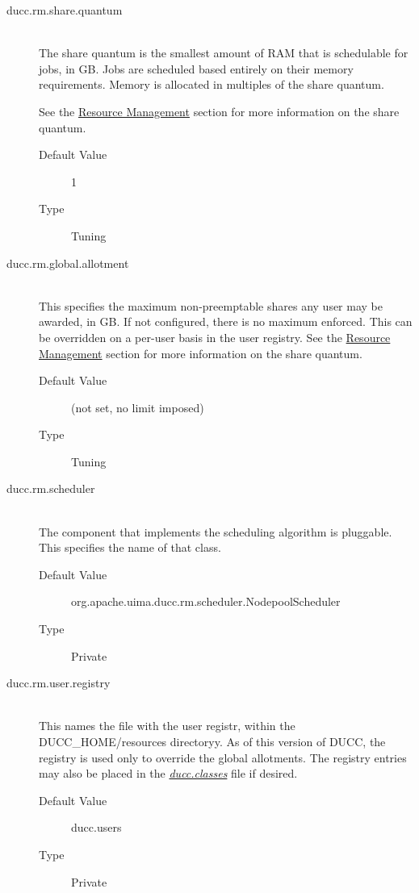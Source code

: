 \begin{description}
        \item[ducc.rm.share.quantum] \hfill \\
          The share quantum is the smallest amount of RAM that is schedulable for jobs, in GB. 
          Jobs are scheduled based entirely on their memory requirements. Memory is allocated in 
          multiples of the share quantum. 

          See the \hyperref[chap:rm]{Resource Management} section for more information on the share quantum.
          \begin{description}
            \item[Default Value] 1
            \item[Type] Tuning 
          \end{description}

        \item[ducc.rm.global.allotment] \hfill \\
          This specifies the maximum non-preemptable shares any user may be awarded, in GB.  If not configured,
          there is no maximum enforced.  This can be overridden on a per-user basis in the user registry.
          See the \hyperref[chap:rm]{Resource Management} section for more information on the share quantum.
          \begin{description}
            \item[Default Value] (not set, no limit imposed)
            \item[Type] Tuning 
          \end{description}

        \item[ducc.rm.scheduler] \hfill \\
          The component that implements the scheduling algorithm is pluggable. This specifies the 
          name of that class. 
          \begin{description}
            \item[Default Value] org.apache.uima.ducc.rm.scheduler.NodepoolScheduler 
            \item[Type] Private
          \end{description} 
          
        \item[ducc.rm.user.registry] \hfill \\
          This names the file with the user registr, within the DUCC\_HOME/resources directoryy.
          As of this version of DUCC, the registry is used
          only to override the global allotments.  The registry entries may also be placed in the
          \hyperref[sec:ducc.classes]{\em ducc.classes} file if desired.
          \begin{description}
            \item[Default Value] ducc.users
            \item[Type] Private
          \end{description} 
          

\end{description}
